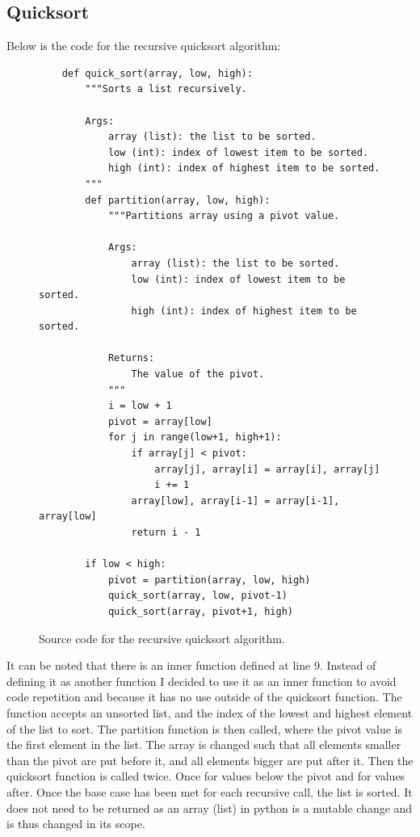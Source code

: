 \subsection{Quicksort}
Below is the code for the recursive quicksort algorithm:
\begin{figure}[H]
	\begin{verbatim}
	def quick_sort(array, low, high):
		"""Sorts a list recursively.
	
		Args:
			array (list): the list to be sorted.
			low (int): index of lowest item to be sorted.
			high (int): index of highest item to be sorted.
		"""
		def partition(array, low, high):
			"""Partitions array using a pivot value.
	
			Args:
				array (list): the list to be sorted.
				low (int): index of lowest item to be sorted.
				high (int): index of highest item to be sorted.
	
			Returns:
				The value of the pivot.
			"""
			i = low + 1
			pivot = array[low]
			for j in range(low+1, high+1):
				if array[j] < pivot:
					array[j], array[i] = array[i], array[j]
					i += 1
				array[low], array[i-1] = array[i-1], array[low]
				return i - 1
				
		if low < high:
			pivot = partition(array, low, high)
			quick_sort(array, low, pivot-1)
			quick_sort(array, pivot+1, high)
	\end{verbatim}
	\caption{Source code for the recursive quicksort algorithm.}
\end{figure}
It can be noted that there is an inner function defined at line 9. Instead of defining it as another function I decided to use it as an inner function to avoid code repetition and because it has no use outside of the quicksort function. The function accepts an unsorted list, and the index of the lowest and highest element of the list to sort. The partition function is then called, where the pivot value is the first element in the list. The array is changed such that all elements smaller than the pivot are put before it, and all elements bigger are put after it. Then the quicksort function is called twice. Once for values below the pivot and for values after. Once the base case has been met for each recursive call, the list is sorted. It does not need to be returned as an array (list) in python is a mutable change and is thus changed in its scope.
